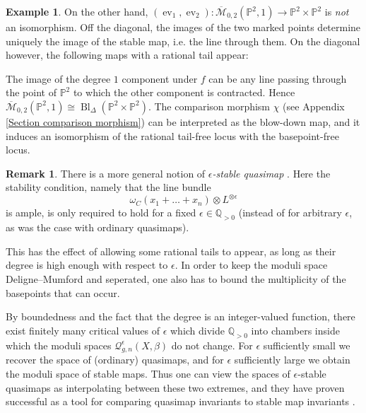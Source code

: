 \documentclass[11pt]{amsart}
\newcommand{\M}[4]{\overline{\mathcal{M}}_{#1,#2}(#3,#4)}
\newcommand{\Q}[4]{\mathcal{Q}_{#1,#2}(#3,#4)}
\newcommand{\Qe}[4]{\mathcal{Q}^{\epsilon}_{#1,#2}(#3,#4)}
\newcommand{\PP}{\mathbb P}
\renewcommand{\to}{\rightarrow}
\newcommand{\comp}{\chi}
\newcommand{\QQ}{\mathbb{Q}}
\newcommand{\ev}{\operatorname{ev}}
\theoremstyle{definition}
\theoremstyle{definition}
\newtheorem{example}[thm]{Example}
\newtheorem{remark}[thm]{Remark}
\newcommand{\ilemph}[1]{\emph{#1}}
\begin{document}
\begin{example}
On the other hand, $(\ev_1,\ev_2)\colon\M{0}{2}{\PP^2}{1}\to\PP^2\times\PP^2$ is \emph{not} an isomorphism. Off the diagonal, the images of the two marked points determine uniquely the image of the stable map, i.e. the line through them. On the diagonal however, the following maps with a rational tail appear:
\begin{center}
\end{center}
The image of the degree $1$ component under $f$ can be any line passing through the point of $\PP^2$ to which the other component is contracted. Hence $\M{0}{2}{\PP^2}{1}\cong\operatorname{Bl}_{\Delta}(\PP^2\times\PP^2)$. The comparison morphism $\comp$ (see Appendix \ref{Section comparison morphism}) can be interpreted as the blow-down map, and it induces an isomorphism of the rational tail-free locus with the basepoint-free locus.
\end{example}


\begin{remark}
 There is a more general notion of \ilemph{$\epsilon$-stable quasimap} \cite[\S 7.1]{CFKM}. Here the stability condition, namely that the line bundle
\begin{equation*} \omega_C(x_1 + \ldots + x_n)\otimes L^{\otimes \epsilon} \end{equation*} 
is ample, is only required to hold for a fixed $\epsilon \in \QQ_{>0}$ (instead of for arbitrary $\epsilon$, as was the case with ordinary quasimaps).

This has the effect of allowing some rational tails to appear, as long as their degree is high enough with respect to $\epsilon$. In order to keep the moduli space Deligne--Mumford and seperated, one also has to bound the multiplicity of the basepoints that can occur.

By boundedness and the fact that the degree is an integer-valued function, there exist finitely many critical values of $\epsilon$ which divide $\QQ_{>0}$ into chambers inside which the moduli spaces $\Qe{g}{n}{X}{\beta}$ do not change.
For $\epsilon$ sufficiently small we recover the space of (ordinary) quasimaps, and for $\epsilon$ sufficiently large we obtain the moduli space of stable maps. Thus one can view the spaces of $\epsilon$-stable quasimaps as interpolating between these two extremes, and they have proven  successful as a tool for comparing quasimap invariants to stable map invariants \cite{TodaStableQuotient} \cite{CF-K-wallcrossing}.
\end{remark}
\end{document}
